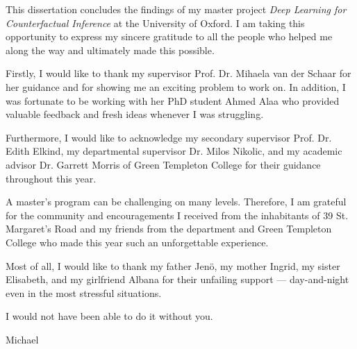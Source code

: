 

This dissertation concludes the findings of my master project \emph{Deep Learning for Counterfactual Inference} at the University of Oxford. I am taking this opportunity to express my sincere gratitude to all the people who helped me along the way and ultimately made this possible.

Firstly, I would like to thank my supervisor Prof. Dr. Mihaela van der Schaar for her guidance and for showing me an exciting problem to work on. In addition, I was fortunate to be working with her PhD student Ahmed Alaa who provided valuable feedback and fresh ideas whenever I was struggling. 

Furthermore, I would like to acknowledge my secondary supervisor Prof. Dr. Edith Elkind, my departmental supervisor Dr. Milos Nikolic, and  my academic advisor Dr. Garrett Morris of Green Templeton College for their guidance throughout this year. 

A master's program can be challenging on many levels. Therefore, I am grateful for the community and encouragements I received from the inhabitants of 39 St. Margaret's Road and my friends from the department and Green Templeton College who made this year such an unforgettable experience. 

Most of all, I would like to thank my father Jenö, my mother Ingrid, my sister Elisabeth, and my girlfriend Albana for their unfailing support  --- day-and-night even in the most stressful situations. 

I would not have been able to do it without you. 

\begin{flushright}
Michael 
\end{flushright}


	
